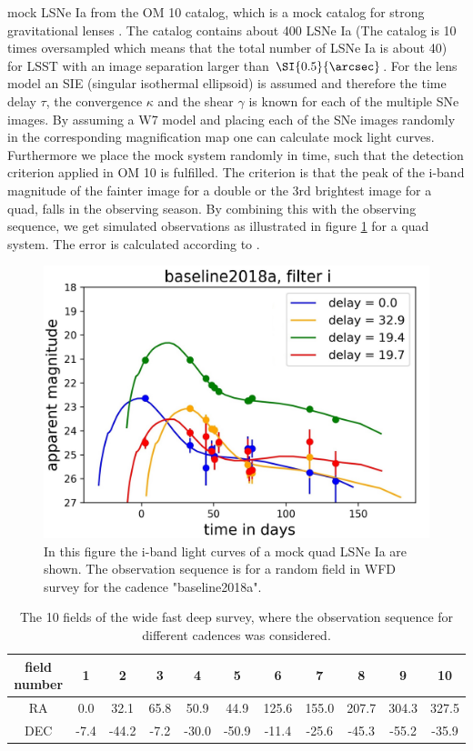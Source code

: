 mock LSNe Ia from the OM 10 catalog, which is a mock catalog for
strong gravitational lenses \citep{Oguri:2010}. The catalog contains
about 400 LSNe Ia (The catalog is 10 times oversampled which means
that the total number of LSNe Ia is about 40) for LSST with an image
separation larger than $\SI{0.5}{\arcsec}$. For the lens model an SIE
(singular isothermal ellipsoid) \citep{Kormann:1994} is assumed and
therefore the time delay $\tau$, the convergence $\kappa$ and the
shear $\gamma$ is known for each of the multiple SNe images. By
assuming a W7 model and placing each of the SNe images randomly in the
corresponding magnification map one can calculate mock light
curves. Furthermore we place the mock system randomly in time, such
that the detection criterion applied in OM 10 is fulfilled. The
criterion is that the peak of the i-band magnitude of the fainter image
for a double or the 3rd brightest image for a quad, falls in the
observing season.
By combining this with the observing sequence, we get simulated
observations as illustrated in figure \ref{fig: simulated observation}
for a quad system. The error is calculated according to \cite[sec 3.5,
p. 67]{2009:LSSTscience}.
\begin{figure}[h!]
\centering
\includegraphics[scale=0.7]{figures/Obsevation_number399_baseline2018a_filter_i_oversampling_00.jpg}
\caption[]{In this figure the i-band light curves of a mock quad LSNe Ia are shown. The observation sequence is for a random field in WFD survey for the cadence "baseline2018a".}
\label{fig: simulated observation}
\end{figure}
%
\begin{table}
\centering
\begin{tabular}{c|c|c|c|c|c|c|c|c|c|c}
field number & 1 & 2 & 3 & 4 & 5& 6 & 7 & 8 & 9 & 10  \\
\hline
RA& 0.0 & 32.1 & 65.8 & 50.9 &44.9& 125.6 & 155.0 & 207.7 & 304.3 & 327.5  \\
\hline
DEC& -7.4 & -44.2 & -7.2 & -30.0 & -50.9& -11.4 & -25.6 & -45.3 & -55.2 & -35.9  \\
\end{tabular}
\caption{The 10 fields of the wide fast deep survey, where the observation sequence for different cadences was considered.}
\label{tab: 10 wfd fields}
\end{table}
%
\FloatBarrier

